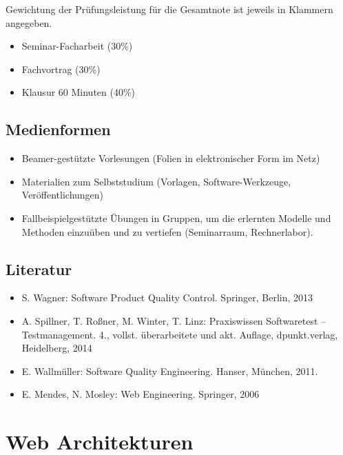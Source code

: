 Gewichtung der Prüfungsleistung für die Gesamtnote ist jeweils in
Klammern angegeben.

\begin{itemize}
\tightlist
\item
  Seminar-Facharbeit (30\%)
\item
  Fachvortrag (30\%)
\item
  Klausur 60 Minuten (40\%)
\end{itemize}

\section*{Medienformen\label{/mi-2017/modulbeschreibungen-master/MA_WTW_Modul_QUS_Winter}}\label{medienformenpathlabelmi-2017modulbeschreibungen-mastermaux5fwtwux5fmodulux5fqusux5fwinter}

\begin{itemize}
\tightlist
\item
  Beamer-gestützte Vorlesungen (Folien in elektronischer Form im Netz)
\item
  Materialien zum Selbststudium (Vorlagen, Software-Werkzeuge,
  Veröffentlichungen)
\item
  Fallbeispielgestützte Übungen in Gruppen, um die erlernten Modelle und
  Methoden einzuüben und zu vertiefen (Seminarraum, Rechnerlabor).
\end{itemize}

\section*{Literatur\label{/mi-2017/modulbeschreibungen-master/MA_WTW_Modul_QUS_Winter}}\label{literaturpathlabelmi-2017modulbeschreibungen-mastermaux5fwtwux5fmodulux5fqusux5fwinter}

\begin{itemize}
\tightlist
\item
  S. Wagner: Software Product Quality Control. Springer, Berlin, 2013
\item
  A. Spillner, T. Roßner, M. Winter, T. Linz: Praxiswissen Softwaretest
  -- Testmanagement. 4., vollst. überarbeitete und akt. Auflage,
  dpunkt.verlag, Heidelberg, 2014
\item
  E. Wallmüller: Software Quality Engineering. Hanser, München, 2011.
\item
  E. Mendes, N. Mosley: Web Engineering. Springer, 2006
\end{itemize}

\chapter{Web
Architekturen\label{/mi-2017/modulbeschreibungen-master/MA_WTW_Modul_Web-Architekturen}}\label{web-architekturenpathlabelmi-2017modulbeschreibungen-mastermaux5fwtwux5fmodulux5fweb-architekturen}

